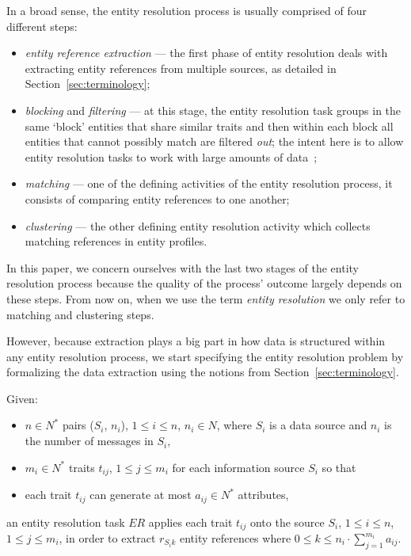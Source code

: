 In a broad sense, the entity resolution process is usually comprised of four
different steps\cite{Pap19,Tal11}:

\begin{itemize}
    \item \textit{entity reference extraction} --- the first phase of entity
    resolution deals with extracting entity references from multiple
    sources, as detailed in Section~\ref{sec:terminology};
    \item \textit{blocking} and \textit{filtering} --- at this stage, the
    entity resolution task groups in the same `block' entities that share
    similar traits and then within each block all entities that cannot
    possibly match are filtered \textit{out}; the intent here is to allow
    entity resolution tasks to work with large amounts of data~\cite{Pap19};
    \item \textit{matching} --- one of the defining activities of the entity
    resolution process, it consists of comparing entity references to one
    another;
    \item \textit{clustering} --- the other defining entity resolution
    activity which collects matching references in entity profiles.
\end{itemize}

In this paper, we concern ourselves with the last two stages of the entity
resolution process because the quality of the process' outcome largely
depends on these steps.
From now on, when we use the term \textit{entity resolution} we only refer
to matching and clustering steps.

However, because extraction plays a big part in how data is structured
within any entity resolution process, we start specifying the entity
resolution problem by formalizing the data extraction using the notions from
Section~\ref{sec:terminology}.

Given:
\begin{itemize}
    \item $n \in N^*$ pairs ($S_i$, $n_i$), $1 \leq i \leq n$, $n_i \in N$, 
    where $S_i$ is a data source and $n_i$ is the number of messages in
    $S_i$,
    \item $m_i \in N^*$ traits $t_{ij}$, $1 \leq j \leq m_i$ for each
    information source $S_i$ so that
    \item each trait $t_{ij}$ can generate at most $a_{ij} \in N^*$
    attributes,
\end{itemize}
an entity resolution task $ER$ applies each trait $t_{ij}$ onto the source
$S_i$, $1 \leq i \leq n$, $1 \leq j \leq m_i$, in order to extract
$r_{{S_i}k}$ entity references where
$0 \leq k \leq n_i \cdot \sum^{m_i}_{j=1}a_{ij}$.


